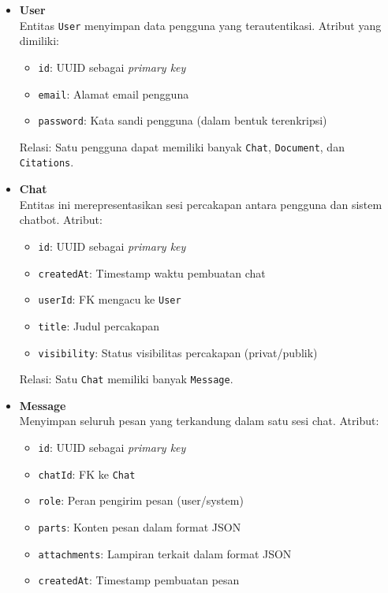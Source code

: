 \begin{itemize}
  \item \textbf{User} \\
  Entitas \texttt{User} menyimpan data pengguna yang terautentikasi. Atribut yang dimiliki:
  \begin{itemize}
    \item \texttt{id}: UUID sebagai \textit{primary key}
    \item \texttt{email}: Alamat email pengguna
    \item \texttt{password}: Kata sandi pengguna (dalam bentuk terenkripsi)
  \end{itemize}
  Relasi: Satu pengguna dapat memiliki banyak \texttt{Chat}, \texttt{Document}, dan \texttt{Citations}.

  \item \textbf{Chat} \\
  Entitas ini merepresentasikan sesi percakapan antara pengguna dan sistem chatbot. Atribut:
  \begin{itemize}
    \item \texttt{id}: UUID sebagai \textit{primary key}
    \item \texttt{createdAt}: Timestamp waktu pembuatan chat
    \item \texttt{userId}: FK mengacu ke \texttt{User}
    \item \texttt{title}: Judul percakapan
    \item \texttt{visibility}: Status visibilitas percakapan (privat/publik)
  \end{itemize}
  Relasi: Satu \texttt{Chat} memiliki banyak \texttt{Message}.

  \item \textbf{Message} \\
  Menyimpan seluruh pesan yang terkandung dalam satu sesi chat. Atribut:
  \begin{itemize}
    \item \texttt{id}: UUID sebagai \textit{primary key}
    \item \texttt{chatId}: FK ke \texttt{Chat}
    \item \texttt{role}: Peran pengirim pesan (user/system)
    \item \texttt{parts}: Konten pesan dalam format JSON
    \item \texttt{attachments}: Lampiran terkait dalam format JSON
    \item \texttt{createdAt}: Timestamp pembuatan pesan
  \end{itemize}


\end{itemize}
